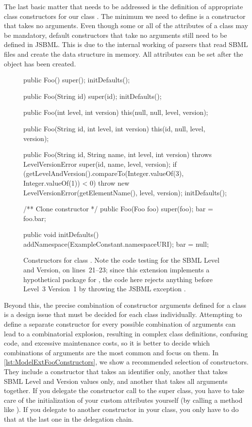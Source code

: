 The last basic matter that needs to be addressed is the definition of
appropriate class constructors for our class .  The minimum we
need to define is a constructor that takes no arguments.  Even though some
or all of the attributes of a class may be mandatory, default constructors
that take no arguments still need to be defined in JSBML.  This is due to
the internal working of parsers that read SBML files and create the data
structure in memory.  All attributes can be set after the object has been
created.

\begin{figure}[b]
  \begin{example}[numbers=left]
public Foo() {
  super();
  initDefaults();
}

public Foo(String id) {
  super(id);
  initDefaults();
}

public Foo(int level, int version){
  this(null, null, level, version);
}

public Foo(String id, int level, int version) {
  this(id, null, level, version);
}

public Foo(String id, String name, int level, int version) throws LevelVersionError {
  super(id, name, level, version);
  if (getLevelAndVersion().compareTo(Integer.valueOf(3), Integer.valueOf(1)) < 0) {
    throw new LevelVersionError(getElementName(), level, version);
  }
  initDefaults();
}

/** Clone constructor */
public Foo(Foo foo) {
  super(foo);
  bar = foo.bar;
}

public void initDefaults() {
  addNamespace(ExampleConstant.namespaceURI);
  bar = null;
}\end{example}
  \caption{Constructors for class .  Note the code testing for
    the SBML Level and Version, on lines~21--23; since this extension
    implements a hypothetical package for \SBMLthree, the code here rejects
    anything before Level~3 Version~1 by throwing the JSBML exception
    \LevelVersionError.}
  \label{lst:ModelExtFooConstructors}
\end{figure}

Beyond this, the precise combination of constructor arguments defined for a
class is a design issue that must be decided for each class individually.
Attempting to define a separate constructor for every possible combination
of arguments can lead to a combinatorial explosion, resulting in complex
class definitions, confusing code, and excessive maintenance costs, so it
is better to decide which combinations of arguments are the most common and
focus on them.  In \vref{lst:ModelExtFooConstructors}, we show a
recommended selection of constructors.  They include a constructor that
takes an identifier only, another that takes SBML Level and Version values
only, and another that takes all arguments together.  If you delegate the
constructor call to the super class, you have to take care of the
initialization of your custom attributes yourself (by calling a method like
).  If you delegate to another constructor in your
class, you only have to do that at the last one in the delegation chain.



